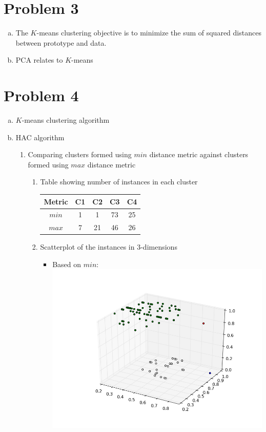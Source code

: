 \documentclass[11pt]{article}
\begin{document}
\section{Problem 3}
\begin{enumerate}[a.]
\item The $K$-means clustering objective is to minimize the sum of squared distances between prototype and data.
\item PCA relates to $K$-means
\end{enumerate}

\section{Problem 4}
\begin{enumerate}[a.]
\item $K$-means clustering algorithm
\item HAC algorithm
\begin{enumerate}
\item Comparing clusters formed using $min$ distance metric against clusters formed using $max$ distance metric
\begin{enumerate}
\item Table showing number of instances in each cluster\\
\begin{tabular}{|c|c|c|c|c|}
\hline
Metric & C1 & C2 & C3 & C4\\ \hline
$min$ & 1 & 1 & 73 & 25\\ \hline
$max$ & 7 & 21 & 46 & 26\\
\hline
\end{tabular}
\item Scatterplot of the instances in 3-dimensions
	\begin{itemize}
	\item Based on $min$:\\
	\includegraphics[width=120mm]{graphhac.png}

\end{itemize}
\end{enumerate}
\end{enumerate}
\end{enumerate}
\end{document}
